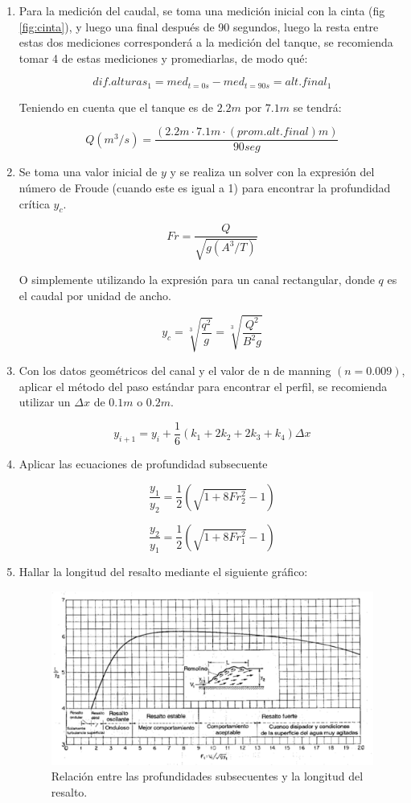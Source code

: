 \documentclass[10pt, a4paper]{exam}
\begin{document}
\begin{enumerate}

    \item Para la medición del caudal, se toma una medición inicial con la cinta (fig \ref{fig:cinta}), y luego una final después de 90 segundos, luego la resta entre estas dos mediciones corresponderá a la medición del tanque, se recomienda tomar 4 de estas mediciones y promediarlas, de modo qué:

    $$dif.alturas_1=med_{t=0s}-med_{t=90s}=alt.final_{1}$$

    Teniendo en cuenta que el tanque es de $2.2m$ por $7.1m$ se tendrá:

    $$Q (m^3/s)=\dfrac{(2.2m\cdot 7.1m \cdot (prom.alt.final) m)}{90seg}$$
    
    \item Se toma una valor inicial de $y$ y se realiza un solver con la expresión del número de Froude (cuando este es igual a 1) para encontrar la profundidad crítica $y_c$.

    $$Fr=\dfrac{Q}{\sqrt{g(A^3/T)}}$$

    O simplemente utilizando la expresión para un canal rectangular, donde $q$ es el caudal por unidad de ancho.

    $$y_c=\sqrt[3]{\dfrac{q^2}{g}}=\sqrt[3]{\dfrac{Q^2}{B^2 g}}$$
    
    \item Con los datos geométricos del canal y el valor de n de manning $(n=0.009)$, aplicar el método del paso estándar para encontrar el perfil, se recomienda utilizar un $\Delta x$ de $0.1m$ o $0.2m$.

    $$y_{i+1}=y_{i}+\dfrac{1}{6}(k_1+2k_2+2k_3+k_4)\Delta x$$

    
    \item Aplicar las ecuaciones de profundidad subsecuente

    $$\dfrac{y_1}{y_2}=\dfrac{1}{2}\left(\sqrt{1+8Fr^2_2}-1\right)$$    

\newpage

    $$\dfrac{y_2}{y_1}=\dfrac{1}{2}\left(\sqrt{1+8Fr^2_1}-1\right)$$
    
    \item Hallar la longitud del resalto mediante el siguiente gráfico:

    \begin{figure}[h]
        \centering
        \includegraphics[width=0.9\linewidth]{Images/resalto.png}
        \caption{Relación entre las profundidades subsecuentes y la longitud del resalto.}
        \label{}
    \end{figure}


\end{enumerate}
\end{document}
